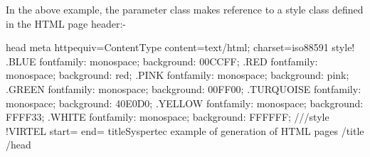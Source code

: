 \documentclass[letterpaper,10pt,english]{sphinxmanual}
\begin{document}
\begin{sphinxVerbatim}[commandchars=\\\{\}]
    
    
\end{sphinxVerbatim}


In the above example, the parameter class makes reference to a style class defined in the HTML page header:-

\begin{sphinxVerbatim}[commandchars=\\\{\}]
\PYGZlt{}head\PYGZgt{}
\PYGZlt{}meta http\PYGZhy{}equiv=\PYGZdq{}Content\PYGZhy{}Type\PYGZdq{} content=\PYGZdq{}text/html; charset=iso\PYGZhy{}8859\PYGZhy{}1\PYGZdq{}\PYGZgt{}
\PYGZlt{}style\PYGZgt{}\PYGZlt{}!\PYGZhy{}\PYGZhy{}
.BLUE \PYGZob{}font\PYGZhy{}family: monospace; background: \PYGZsh{}00CCFF; \PYGZcb{}
.RED \PYGZob{}font\PYGZhy{}family: monospace; background: red; \PYGZcb{}
.PINK \PYGZob{}font\PYGZhy{}family: monospace; background: pink; \PYGZcb{}
.GREEN \PYGZob{}font\PYGZhy{}family: monospace; background: \PYGZsh{}00FF00;\PYGZcb{}
.TURQUOISE \PYGZob{}font\PYGZhy{}family: monospace; background: \PYGZsh{}40E0D0; \PYGZcb{}
.YELLOW \PYGZob{}font\PYGZhy{}family: monospace; background: \PYGZsh{}FFFF33;\PYGZcb{}
.WHITE \PYGZob{}font\PYGZhy{}family: monospace; background: \PYGZsh{}FFFFFF; \PYGZcb{}
//\PYGZhy{}\PYGZhy{}\PYGZgt{}\PYGZlt{}/style\PYGZgt{}
\PYGZlt{}!\PYGZhy{}\PYGZhy{}VIRTEL start=\PYGZdq{}\PYGZob{}\PYGZob{}\PYGZob{}\PYGZdq{} end=\PYGZdq{}\PYGZcb{}\PYGZcb{}\PYGZcb{}\PYGZdq{} \PYGZhy{}\PYGZhy{}\PYGZgt{}
\PYGZlt{}title\PYGZgt{}Syspertec \PYGZhy{} example of generation of HTML pages\PYGZcb{}\PYGZcb{}\PYGZcb{} \PYGZlt{}/title\PYGZgt{}
\PYGZlt{}/head\PYGZgt{}
\end{sphinxVerbatim}

\end{document}
